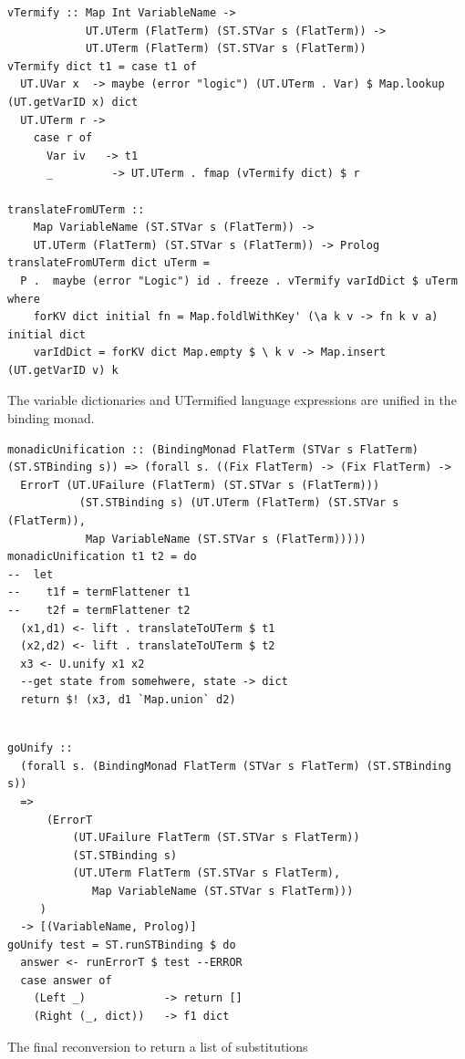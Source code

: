 \documentclass[thesis-solanki.tex]{subfiles}
\begin{document}
\begin{verbatim}
vTermify :: Map Int VariableName ->
            UT.UTerm (FlatTerm) (ST.STVar s (FlatTerm)) ->
            UT.UTerm (FlatTerm) (ST.STVar s (FlatTerm))
vTermify dict t1 = case t1 of
  UT.UVar x  -> maybe (error "logic") (UT.UTerm . Var) $ Map.lookup (UT.getVarID x) dict
  UT.UTerm r ->
    case r of
      Var iv   -> t1
      _         -> UT.UTerm . fmap (vTermify dict) $ r

translateFromUTerm :: 
    Map VariableName (ST.STVar s (FlatTerm)) ->
    UT.UTerm (FlatTerm) (ST.STVar s (FlatTerm)) -> Prolog
translateFromUTerm dict uTerm =
  P .  maybe (error "Logic") id . freeze . vTermify varIdDict $ uTerm where
    forKV dict initial fn = Map.foldlWithKey' (\a k v -> fn k v a) initial dict
    varIdDict = forKV dict Map.empty $ \ k v -> Map.insert (UT.getVarID v) k
\end{verbatim}


The variable dictionaries and UTermified language expressions are unified in the binding monad. 

\begin{verbatim}
monadicUnification :: (BindingMonad FlatTerm (STVar s FlatTerm) (ST.STBinding s)) => (forall s. ((Fix FlatTerm) -> (Fix FlatTerm) -> 
  ErrorT (UT.UFailure (FlatTerm) (ST.STVar s (FlatTerm)))
           (ST.STBinding s) (UT.UTerm (FlatTerm) (ST.STVar s (FlatTerm)),
            Map VariableName (ST.STVar s (FlatTerm)))))
monadicUnification t1 t2 = do
--  let
--    t1f = termFlattener t1
--    t2f = termFlattener t2
  (x1,d1) <- lift . translateToUTerm $ t1
  (x2,d2) <- lift . translateToUTerm $ t2
  x3 <- U.unify x1 x2
  --get state from somehwere, state -> dict
  return $! (x3, d1 `Map.union` d2)
\end{verbatim}


\begin{verbatim}

goUnify ::
  (forall s. (BindingMonad FlatTerm (STVar s FlatTerm) (ST.STBinding s))
  =>
      (ErrorT
          (UT.UFailure FlatTerm (ST.STVar s FlatTerm))
          (ST.STBinding s)
          (UT.UTerm FlatTerm (ST.STVar s FlatTerm),
             Map VariableName (ST.STVar s FlatTerm)))
     )
  -> [(VariableName, Prolog)]
goUnify test = ST.runSTBinding $ do
  answer <- runErrorT $ test --ERROR
  case answer of
    (Left _)            -> return []
    (Right (_, dict))   -> f1 dict
\end{verbatim}


The final reconversion to return a list of substitutions
\end{document}
